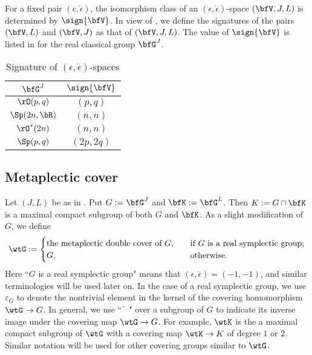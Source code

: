 \documentclass[12pt,a4paper]{amsart}
\newcommand{\Z}{\mathbb{Z}}
\numberwithin{equation}{section}
\theoremstyle{remark}
\newtheorem*{remark}{Remark}
\def\wtbfK{\widetilde{\bfK}}
\begin{document}
For a fixed pair $(\epsilon, \dot \epsilon)$, the isomorphism class of an $(\epsilon, \dot \epsilon)$-space $(\bfV,J,L)$ is
determined by $\sign{\bfV}$. In view of , we define the signatures of the pairs $(\bfV,L)$ and $(\bfV,J)$  as that of $(\bfV,J,L)$.
The value of $\sign{\bfV}$ is listed in  for the real classical group $\bfG^J$.
\begin{table}[h!]
\centering
\begin{tabular}{c|c}
  \hline
  $\bfG^J$ & $\sign{\bfV}$ \\
  \hline
  $\rO(p,q)$ & $(p,q)$\\
  $\Sp(2n,\bR)$ & $(n,n)$\\
  $\rO^*(2n)$ & $(n,n)$\\
  $\Sp(p,q)$ & $(2p,2q)$\\
  \hline
\end{tabular}
\vspace*{.5em}
\caption{Signature of $(\epsilon, \dot \epsilon)$-spaces}\label{tab:sign}
\end{table}






\subsection{Metaplectic cover}\label{sec:MC}
Let $(J,L)$ be as in .  Put $G := \bfG^J$ and $\bfK :=
\bfG^L$. Then $K:=G\cap \bfK$ is a maximal compact subgroup of both $G$ and
$\bfK$.  As a slight modification of $G$, we define
 \[
   \wtG:=
   \begin{cases}
     \textrm{the metaplectic double cover of $G$},\quad
     &\textrm{if $G$ is a real symplectic group};\\
     G,\quad &\textrm{otherwise}.
   \end{cases}
 \]
 Here ``$G$ is a real symplectic group" means that $(\epsilon, \dot \epsilon)=(-1,-1)$, and similar terminologies will be used later on.
 In the case of a real symplectic group, we use $\varepsilon_G$
 to denote the nontrivial element in the kernel of the covering homomorphism
 $\wtG \rightarrow G$.  In general, we use ``$\,\widetilde{\phantom{a}}\,$"
 over a subgroup of $G$ to indicate its inverse image under the covering map
 $\wtG\rightarrow G$.
 For example, $\wtK$ is the a maximal compact subgroup of
 $\wtG$ with a covering map $\wtK\rightarrow K$ of degree $1$ or
 $2$. Similar notation will be used for other covering groups similar to $\wtG$.
\end{document}
